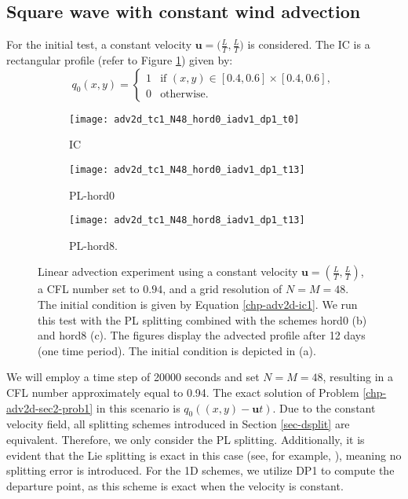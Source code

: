 \subsection{Square wave with constant wind advection}
For the initial test, a constant velocity $\boldsymbol{u}=\big(\frac{L}{T},\frac{L}{T}\big)$ is considered.
The IC is a rectangular profile (refer to Figure \ref{chp-adv2d-sec-exp-adv1-a}) given by:
\begin{equation}
	\label{chp-adv2d-ic1}
	q_0(x,y) =  
	\begin{cases}
		1 & \text{if } (x,y) \in [0.4,0.6]\times [0.4,0.6],\\
		0 & \text{otherwise}.
	\end{cases}
\end{equation}
\begin{figure}[!htb]
	\centering
	\begin{subfigure}{0.3\textwidth}
		\centering
		\texttt{[image: adv2d\_tc1\_N48\_hord0\_iadv1\_dp1\_t0]}
		\caption{IC\label{chp-adv2d-sec-exp-adv1-a}}
	\end{subfigure}
	\begin{subfigure}{0.3\textwidth}
		\centering
		\texttt{[image: adv2d\_tc1\_N48\_hord0\_iadv1\_dp1\_t13]}
		\caption{PL-hord0\label{chp-adv2d-sec-exp-adv1-b}}
	\end{subfigure}
	\begin{subfigure}{0.3\textwidth}
		\centering
		\texttt{[image: adv2d\_tc1\_N48\_hord8\_iadv1\_dp1\_t13]}
		\caption{PL-hord8.\label{chp-adv2d-sec-exp-adv1-c}}
	\end{subfigure}	
	\caption{Linear advection experiment using a constant velocity $\boldsymbol{u} = \left(\frac{L}{T},\frac{L}{T}\right)$, 
	a CFL number set to $0.94$, and a grid resolution of $N=M=48$.
	The initial condition is given by Equation \eqref{chp-adv2d-ic1}.
	We run this test with the PL splitting combined with the schemes hord0 (b) and hord8 (c).
        The figures display the advected profile after 12 days (one time period).
        The initial condition is depicted in (a). \label{chp-adv2d-sec-exp-adv1}}
\end{figure}

We will employ a time step of 20000 seconds and set $N=M=48$, resulting in a CFL number approximately equal to 0.94.
The exact solution of Problem \ref{chp-adv2d-sec2-prob1} in this scenario is $q_0((x,y)-\boldsymbol{u}t)$.
Due to the constant velocity field, all splitting schemes introduced in Section \ref{sec-dsplit} are equivalent.
Therefore, we only consider the PL splitting. Additionally, it is evident that the Lie splitting is exact in this case 
(see, for example, \cite[p.~202-203]{leveque:1990}), meaning no splitting error is introduced.
For the 1D schemes, we utilize DP1 to compute the departure point, as this scheme is exact when the velocity is constant.

